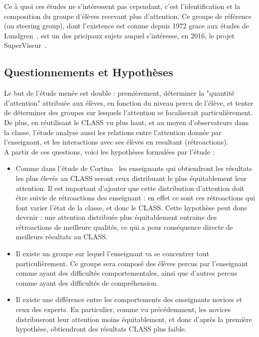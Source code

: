 \documentclass{article}
\begin{document}
Ce à quoi ces études ne s'intéressent pas cependant, c'est l'identification et la composition du groupe d'élèves recevant plus d'attention. Ce groupe de référence (ou steering group), dont l'existence est connue depuis 1972 grace aux études de Lundgren~\cite{Lundgren}, est un des pricipaux sujets auquel s'intéresse, en 2016, le projet SuperViseur~\cite{SuperViseur}.

\subsection{Questionnements et Hypothèses}
Le but de l'étude menée est double : premièrement, déterminer la "quantité d'attention" attribuée aux élèves, en fonction du niveau percu de l'élève, et tenter de déterminer des groupes sur lesquels l'attention se focaliserait particulièrement. De plus, en réutilisant le CLASS vu plus haut, et au moyen d'observateurs dans la classe, l'étude analyse aussi les relations entre l'attention donnée par l'enseignant, et les interactions avec ses élèves en resultant (rétroactions).\\
A partir de ces questions, voici les hypothèses formulées par l'étude :
\begin{itemize}
  \item Comme dans l'étude de Cortina~\cite{Cortina} les enseignants qui obtiendront les résultats les plus élevés au CLASS seront ceux distribuant le plus équitablement leur attention. Il est important d'ajouter que cette distribution d'attention doit étre suivie de rétroactions des enseignant : en effet ce sont ces rétroactions qui font varier l'état de la classe, et donc le CLASS. Cette hypothèse peut donc devenir : une attention distribuée plus équitablement entraine des rétroactions de meilleure qualités, ce qui a pour conséquence directe de meilleurs résultats au CLASS.
  \item Il existe un groupe sur lequel l'enseignant va se concentrer tout particulièrement. Ce groupe sera composé des élèves percus par l'enseignant comme ayant des difficultés comportementales, ainsi que d'autres percus comme ayant des difficultés de compréhension.
  \item Il existe une différence entre les comportements des enseignants novices et ceux des experts. En particulier, comme vu précédemment, les novices distribueront leur attention moins équitablement, et donc d'après la première hypothèse, obtiendront des résultats CLASS plus faible.
\end{itemize}
\end{document}
